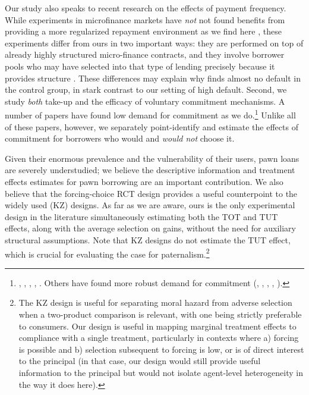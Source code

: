 \documentclass[12pt, a4paper]{article}
\begin{document}
Our study also speaks to recent research on the effects of payment frequency. While experiments in microfinance markets have \textit{not} not found benefits from providing a more regularized repayment environment as we find here \citep{Pande, barboni2023flexible, Field}, these experiments differ from ours in two important ways: they are performed on top of already highly structured micro-finance contracts, and they involve borrower pools who may have selected into that type of lending precisely because it provides structure \cite{bauer2012behavioral}. These differences may explain why \citep{Pande} finds almost no default in the control group, in stark contrast to our setting of high default. Second, we study \textit{both} take-up and the efficacy of voluntary commitment mechanisms. A number of papers have found low demand for commitment as we do.\footnote{\cite{Ashraf}, \cite{Gine}, \cite{Ted}, \cite{Royer}, \cite{Sprenger}. Others have found more robust demand for commitment (\cite{Kremer},  \cite{Casaburi}, \cite{Alcohol}, \cite{AprajitP&P}, \cite{Pascaline}).} Unlike all of these papers, however, we separately point-identify and estimate the effects of commitment for borrowers who would and \textit{would not} choose it.  


Given their enormous prevalence and the vulnerability of their users, pawn loans are severely understudied; we believe the descriptive information and treatment effects estimates for pawn borrowing are an important contribution. We also believe that the forcing-choice RCT design provides a useful counterpoint to the widely used \cite{KarlanZinman2009} (KZ) designs. As far as we are aware, ours is the only experimental design in the literature simultaneously estimating both the TOT and TUT effects, along with the average selection on gains, without the need for auxiliary structural assumptions. Note that KZ designs do not estimate the TUT effect, which is crucial for evaluating the case for paternalism.\footnote{The KZ design is useful for separating moral hazard from adverse selection when a two-product comparison is relevant, with one being strictly preferable to consumers.  Our design is useful in mapping marginal treatment effects to compliance with a single treatment, particularly in contexts where a) forcing is possible and b) selection subsequent to forcing is low, or is of direct interest to the principal (in that case, our design would still provide useful information to the principal but would not isolate agent-level heterogeneity in the way it does here).} 
\end{document}
